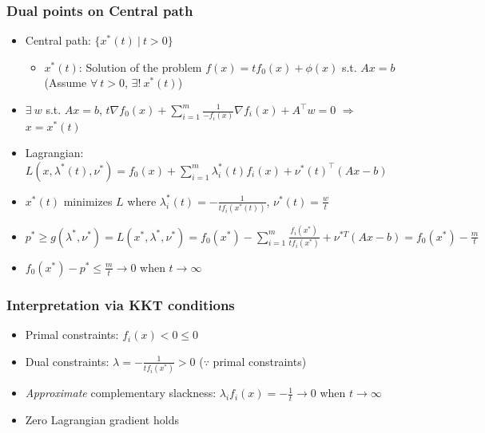 \subsubsection*{Dual points on Central path}
\begin{itemize}
    \item Central path: $\{x^\ast(t)~|~t>0\}$
    \begin{itemize}
        \item $x^\ast(t)$: Solution of the problem $f(x)=tf_0(x)+\phi(x)$ s.t. $Ax=b$ (Assume $\forall~t>0$, $\exists!~x^\ast(t)$)
    \end{itemize}
    \item $\exists~w$ s.t. $Ax=b$, $t\nabla f_0(x)+\sum_{i=1}^m\frac{1}{-f_i(x)}\nabla f_i(x)+A^{\top}w = 0$ $\Rightarrow$ $x=x^\ast(t)$
    \item Lagrangian: $L(x,\lambda^\ast(t),\nu^\ast)=f_0(x)+\sum_{i=1}^{m}\lambda_i^\ast(t)f_i(x)+\nu^\ast(t)^{\top}(Ax-b)$
    \item $x^\ast(t)$ minimizes $L$ where $\lambda_i^\ast(t)=-\frac{1}{tf_i(x^\ast(t))}$, $\nu^\ast(t)=\frac{w}{t}$
    \item $p^\ast\geq g(\lambda^\ast,\nu^\ast)=L(x^\ast,\lambda^\ast,\nu^\ast)=f_0(x^\ast)-\sum_{i=1}^m\frac{f_i(x^\ast)}{tf_i(x^\ast)}+\nu^{\ast T}(Ax-b)=f_0(x^\ast)-\frac{m}{t}$
    \item $f_0(x^\ast)-p^\ast\leq\frac{m}{t}\rightarrow 0$ when $t\rightarrow\infty$
\end{itemize}

\subsubsection*{Interpretation via KKT conditions}
\begin{itemize}
    \item Primal constraints: $f_i(x)<0\leq 0$
    \item Dual constraints: $\lambda=-\frac{1}{tf_i(x^\ast)}>0$ ($\because$ primal constraints)
    \item \textit{Approximate} complementary slackness: $\lambda_if_i(x)=-\frac{1}{t}\rightarrow 0$ when $t\rightarrow\infty$
    \item Zero Lagrangian gradient holds
\end{itemize}

